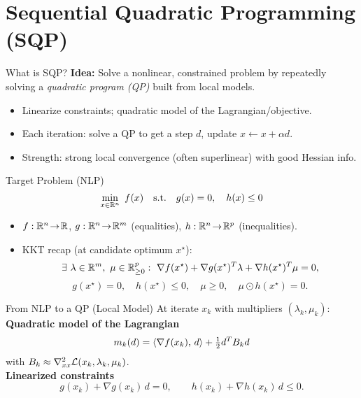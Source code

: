 \section{Sequential Quadratic Programming (SQP)}

\begin{frame}{What is SQP?}
\textbf{Idea:} Solve a nonlinear, constrained problem by repeatedly solving a \emph{quadratic program (QP)} built from local models.\\[4pt]
\begin{itemize}
  \item Linearize constraints; quadratic model of the Lagrangian/objective.
  \item Each iteration: solve a QP to get a step \(d\), update \(x \leftarrow x + \alpha d\).
  \item Strength: strong local convergence (often superlinear) with good Hessian info.
\end{itemize}
\end{frame}

\begin{frame}{Target Problem (NLP)}
\[
\min_{x \in \mathbb{R}^n} \ f(x)
\quad
\text{s.t.}\quad
g(x)=0,\quad h(x)\le 0
\]
\begin{itemize}
  \item \(f:\mathbb{R}^n\!\to\!\mathbb{R}\), \(g:\mathbb{R}^n\!\to\!\mathbb{R}^{m}\) (equalities), \(h:\mathbb{R}^n\!\to\!\mathbb{R}^{p}\) (inequalities).
  \item KKT recap (at candidate optimum \(x^\star\)): 
\[
\exists \ \lambda \in \mathbb{R}^{m},\ \mu \in \mathbb{R}^{p}_{\ge 0}:
\ \nabla f(x^\star) + \nabla g(x^\star)^T\lambda + \nabla h(x^\star)^T \mu = 0,
\]
\[
g(x^\star)=0,\quad h(x^\star)\le 0,\quad \mu \ge 0,\quad \mu \odot h(x^\star) = 0.
\]
\end{itemize}
\end{frame}

\begin{frame}{From NLP to a QP (Local Model)}
At iterate \(x_k\) with multipliers \((\lambda_k,\mu_k)\):\\[4pt]
\textbf{Quadratic model of the Lagrangian}
\[
m_k(d) = \left\langle \nabla f(x_k),\, d \right\rangle + \tfrac{1}{2} d^T B_k d
\]
with \(B_k \approx \nabla^2_{xx}\mathcal{L}(x_k,\lambda_k,\mu_k)\).\\[6pt]
\textbf{Linearized constraints}
\[
g(x_k) + \nabla g(x_k)\, d = 0,\qquad
h(x_k) + \nabla h(x_k)\, d \le 0.
\]
\end{frame}

